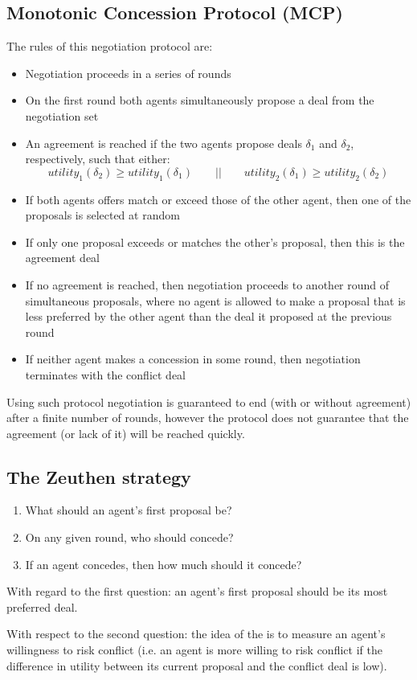 \subsection{Monotonic Concession Protocol (MCP)}
The rules of this negotiation protocol are:
\begin{itemize}
\item Negotiation proceeds in a series of rounds
\item On the first round both agents simultaneously propose a deal from the negotiation set
\item An agreement is reached if the two agents propose deals $\delta_1$ and $\delta_2$, respectively, such that either:
\[utility_1(\delta_2) \ge utility_1(\delta_1)\qquad || \qquad utility_2(\delta_1)\ge utility_2(\delta_2)\]
\item If both agents offers match or exceed those of the other agent, then one of the proposals is selected at random
\item If only one proposal exceeds or matches the other's proposal, then this is the agreement deal
\item If no agreement is reached, then negotiation proceeds to another round of simultaneous proposals, where no agent is allowed to make a proposal that is less preferred by the other agent than the deal it proposed at the previous round
\item If neither agent makes a concession in some round, then negotiation terminates with the conflict deal
\end{itemize}

Using such protocol negotiation is guaranteed to end (with or without agreement) after a finite number of rounds, however the protocol does not guarantee that the agreement (or lack of it) will be reached quickly.
\subsection{The Zeuthen strategy}
\begin{enumerate}
\item What should an agent's first proposal be?
\item On any given round, who should concede?
\item If an agent concedes, then how much should it concede?
\end{enumerate}

With regard to the first question: an agent's first proposal should be its most preferred deal.

With respect to the second question: the idea of the  is to measure an agent's willingness to risk conflict (i.e. an agent is more willing to risk conflict if the difference in utility between its current proposal and the conflict deal is low).

